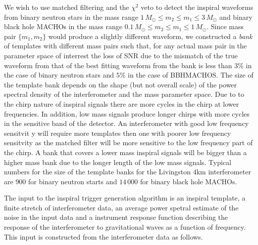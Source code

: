 We wish to use matched filtering and the $\chi^2$ veto to detect the inspiral
waveforms from binary neutron stars in the mass range $1\,M_\odot\le m_2\le
m_1\le 3\,M_\odot$ and binary black hole MACHOs in the mass range
$0.1\,M_\odot\le m_2\le m_1\le 1\,M_\odot$. Since mass pair $\{m_1,m_2\}$
would produce a slightly different waveform, we constructed a {\em bank} of
templates with different mass pairs such that, for any actual mass pair in the
parameter space of interrest the loss of SNR due to the mismatch of the true
waveform from that of the best fitting waveform from the bank is less than
$3\%$ in the case of binary neutron stars and $5\%$ in the case of
BBHMACHOS\cite{owensatyha}.  The size of the template bank depends on the 
shape (but not overall scale) of the power spectral density of the
interferometer and the mass parameter space. Due to to the chirp nature of
inspiral signals there are more cycles in the chirp at lower frequencies. In
addition, low mass signals produce longer chirps with more cycles in the
sensitive band of the detector. An interferometer with good low frequency
sensitvit y will require more templates then one with poorer low frequency
sensitvity as the matched filter will be more sensitive to the low frequency
part of the chirp. A bank that covers a lower mass inspiral signals will be
bigger than a higher mass bank due to the longer length of the low mass signals. 
Typical numbers for the size of the template banks for the Livingston 4km
interferometer are $900$ for binary neutron starts and $14\,000$ for binary
black hole MACHOs.

The input to the inspiral trigger generation algorithm is an inspiral
template, a finite stretch of interferometer data, an average power spetral
estimate of the noise in the input data and a instrument response function
describing the response of the interferometer to gravitational waves as a
function of frequency. This input is constructed from the interferometer data
as follows.  

